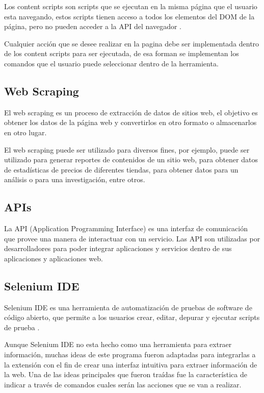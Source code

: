 \documentclass[12pt]{report}
\begin{document}
Los content scripts son scripts que se ejecutan en la misma página que el usuario esta navegando, estos scripts tienen acceso a todos los elementos del DOM de la página, pero no pueden acceder a la API del navegador \cite{chrome2022contentscripts}. \par

Cualquier acción que se desee realizar en la pagina debe ser implementada dentro de los content scripts para ser ejecutada, de esa forman se implementan los comandos que el usuario puede seleccionar dentro de la herramienta.

\subsection{Web Scraping}

El web scraping es un proceso de extracción de datos de sitios web, el objetivo es obtener los datos de la página web y convertirlos en otro formato o almacenarlos en otro lugar. \cite{cording2011algorithms}

El web scraping puede ser utilizado para diversos fines, por ejemplo, puede ser utilizado para generar reportes de contenidos de un sitio web, para obtener datos de estadísticas de precios de diferentes tiendas, para obtener datos para un análisis o para una investigación, entre otros.

\subsection{APIs}

La API (Application Programming Interface) es una interfaz de comunicación que provee una manera de interactuar con un servicio. Las API son utilizadas por desarrolladores para poder integrar aplicaciones y servicios dentro de sus aplicaciones y aplicaciones web. \cite{glez2014web}

\subsection{Selenium IDE}

Selenium IDE es una herramienta de automatización de pruebas de software de código abierto, que permite a los usuarios crear, editar, depurar y ejecutar scripts de prueba \cite{selenium_documentation_2022}.

Aunque Selenium IDE no esta hecho como una herramienta para extraer información, muchas ideas de este programa fueron adaptadas para integrarlas a la extensión con el fin de crear una interfaz intuitiva para extraer información de la web. Una de las ideas principales que fueron traídas fue la característica de indicar a través de comandos cuales serán las acciones que se van a realizar. 
\end{document}
